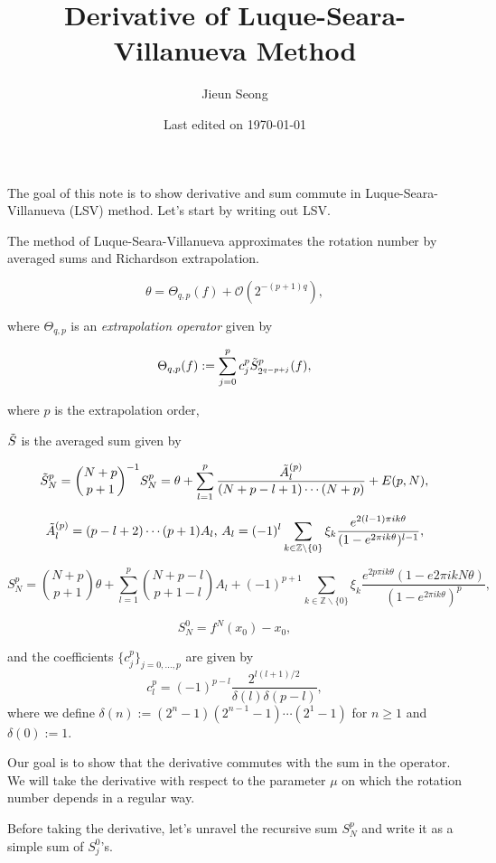\documentclass[12pt]{article}
\title{Derivative of Luque-Seara-Villanueva Method}
\author{Jieun Seong}
\date{Last edited on \today}
\newcommand{\Z}{\mathbb{Z}}
\begin{document}

The goal of this note is to show derivative and sum commute in Luque-Seara-Villanueva (LSV) method. Let's start by writing out LSV.

The method of Luque-Seara-Villanueva approximates the rotation number by averaged sums and Richardson extrapolation. 

$$\theta = \Theta_{q,p}(f)+\mathcal{O}(2^{-(p+1)q}),$$

where $\Theta_{q,p}$ is an \textit{extrapolation operator} given by 

$$\Theta_{q,p}(f) := \sum_{j=0}^{p} c_j^p \Tilde{S}_{2^{q-p+j}}^{p}(f),$$ 

where $p$ is the extrapolation order,

$\Tilde{S}$ is the averaged sum given by

$$\Tilde{S}_N^p = {N+p \choose p+1}^{-1} S_N^p = \theta + \sum_{l=1}^{p} \frac{\Tilde{A}_l^{(p)}}{(N+p-l+1)\cdots(N+p)} + E(p,N),$$

$$\Tilde{A}_l^{(p)} = (p-l+2)\cdots(p+1)A_l \text{, } A_l = (-1)^l \sum_{k\in\Z\backslash\{0\}} \xi_k \frac{e^{2(l-1)\pi i k \theta}}{(1-e^{2\pi i k \theta})^{l-1}}, $$

$$S_N^p = {N+p \choose p+1} \theta + \sum_{l=1}^p {N+p-l \choose p+1-l} A_l + (-1)^{p+1} \sum_{k\in\Z\backslash\{0\}}\xi_k \frac{e^{2p\pi i k\theta}(1-e{2\pi i kN \theta})}{(1-e^{2\pi i k \theta})^p}, $$ 

$$S_N^0 = f^N(x_0)-x_0,$$

and the coefficients $\{c_j^p\}_{j=0,...,p}$ are given by 
$$c_l^p = (-1)^{p-l} \frac{2^{l(l+1)/2}}{\delta(l)\delta(p-l)},$$
where we define $\delta(n) := (2^n-1)(2^{n-1}-1)\cdots(2^1-1)$ for $n\geq1$ and $\delta(0):=1$.

Our goal is to show that the derivative commutes with the sum in the operator. We will take the derivative with respect to the parameter $\mu$ on which the rotation number depends in a regular way.

Before taking the derivative, let's unravel the recursive sum $S_N^p$ and write it as a simple sum of $S_j^0$'s. 
\end{document}
